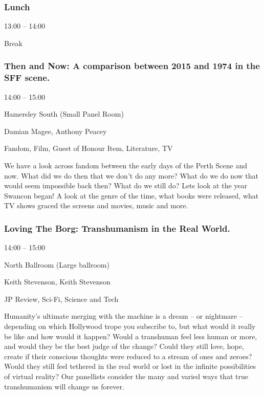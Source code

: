 \documentclass{scrreprt}
\begin{document}
\begin{multicols}{2}
\subsubsection*{Lunch}\begin{description}
\setlength{\itemsep}{0pt}
\setlength{\parsep}{0pt}
\setlength{\parskip}{0pt}
\item[Time:]{13:00 -- 14:00}
\item[Tags:]{Break}\end{description}

\subsubsection*{Then and Now: A comparison between 2015 and 1974 in the SFF scene.}\begin{description}
\setlength{\itemsep}{0pt}
\setlength{\parsep}{0pt}
\setlength{\parskip}{0pt}
\item[Time:]{14:00 -- 15:00}
\item[Venue:]{Hamersley South (Small Panel Room)}
\item[People:]{Damian Magee, Anthony Peacey}
\item[Tags:]{Fandom, Film, Guest of Honour Item, Literature, TV}\end{description}
We have a look across fandom between the early days of the Perth Scene and now. What did we do then that we don't do any more? What do we do now that would seem impossible back then? What do we still do? Lets look at the year Swancon began! A look at the genre of the time, what books were released, what TV shows graced the screens and movies, music and more.
\subsubsection*{Loving The Borg: Transhumanism in the Real World.}\begin{description}
\setlength{\itemsep}{0pt}
\setlength{\parsep}{0pt}
\setlength{\parskip}{0pt}
\item[Time:]{14:00 -- 15:00}
\item[Venue:]{North Ballroom (Large ballroom)}
\item[People:]{Keith Stevenson, Keith Stevenson}
\item[Tags:]{JP Review, Sci-Fi, Science and Tech}\end{description}
Humanity’s ultimate merging with the machine is a dream – or nightmare – depending on which Hollywood trope you subscribe to, but what would it really be like and how would it happen? Would a transhuman feel less human or more, and would they be the best judge of the change? Could they still love, hope, create if their conscious thoughts were reduced to a stream of ones and zeroes? Would they still feel tethered in the real world or lost in the infinite possibilities of virtual reality? Our panellists consider the many and varied ways that true transhumanism will change us forever.

\end{multicols}
\end{document}
